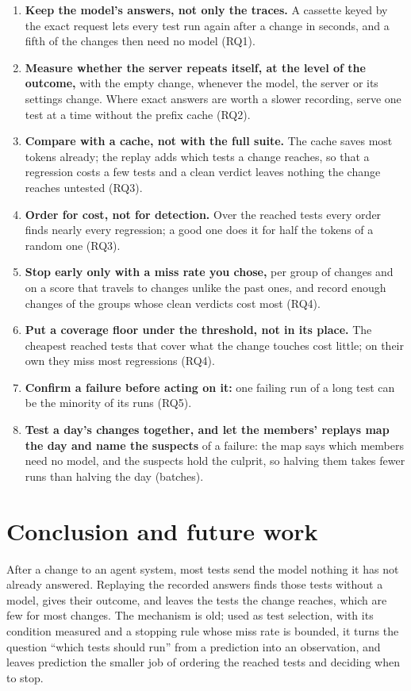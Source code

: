 \documentclass[11pt,a4paper]{article}
\begin{document}
\begin{enumerate}
  \item \textbf{Keep the model's answers, not only the traces.} A cassette keyed by the exact request lets every
        test run again after a change in seconds, and a fifth of the changes then need no model (RQ1).
  \item \textbf{Measure whether the server repeats itself, at the level of the outcome,} with the empty change,
        whenever the model, the server or its settings change. Where exact answers are worth a slower recording,
        serve one test at a time without the prefix cache (RQ2).
  \item \textbf{Compare with a cache, not with the full suite.} The cache saves most tokens already; the
        replay adds which tests a change reaches, so that a regression costs a few tests and a clean verdict
        leaves nothing the change reaches untested (RQ3).
  \item \textbf{Order for cost, not for detection.} Over the reached tests every order finds nearly every
        regression; a good one does it for half the tokens of a random one (RQ3).
  \item \textbf{Stop early only with a miss rate you chose,} per group of changes and on a score that travels to
        changes unlike the past ones, and record enough changes of the groups whose clean verdicts cost most (RQ4).
  \item \textbf{Put a coverage floor under the threshold, not in its place.} The cheapest reached tests that
        cover what the change touches cost little; on their own they miss most regressions (RQ4).
  \item \textbf{Confirm a failure before acting on it:} one failing run of a long test can be the minority of its
        runs (RQ5).
  \item \textbf{Test a day's changes together, and let the members' replays map the day and name the suspects}
        of a failure: the map says which members need no model, and the suspects hold the culprit, so halving them
        takes fewer runs than halving the day (batches).
\end{enumerate}

\section{Conclusion and future work}
\label{sec:conclusion}

After a change to an agent system, most tests send the model nothing it has not already answered. Replaying the
recorded answers finds those tests without a model, gives their outcome, and leaves the tests the change reaches,
which are few for most changes. The mechanism is old; used as test selection, with its condition measured and a
stopping rule whose miss rate is bounded, it turns the question ``which tests should run'' from a prediction into
an observation, and leaves prediction the smaller job of ordering the reached tests and deciding when to stop.
\end{document}
